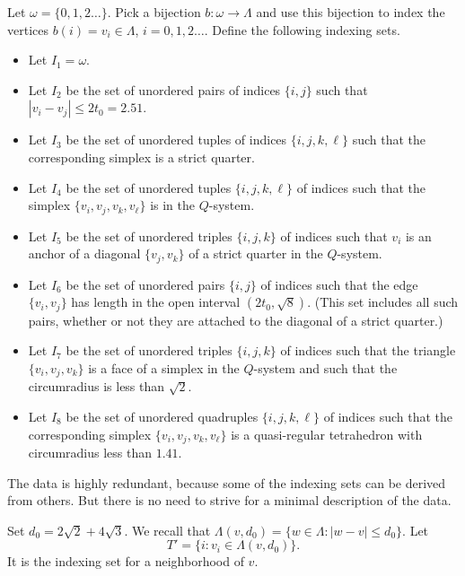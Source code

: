 Let $\omega=\{0,1,2\ldots\}$.  Pick a bijection
$b:\omega\to\Lambda$ and use this bijection to index the vertices
$b(i)=v_i\in\Lambda$, $i=0,1,2\ldots$. Define the following
indexing sets.
   \begin{itemize}
   \item Let $I_1=\omega$.
   \item Let $I_2$ be the set of
      unordered pairs of indices $\{i,j\}$ such that $|v_i-v_j|\le2t_0=2.51$.
   \item Let $I_3$ be the set of unordered tuples of indices
      $\{i,j,k,\ell\}$ such that the corresponding simplex is a strict quarter.
   \item Let $I_4$ be the set of unordered tuples $\{i,j,k,\ell\}$
    of indices
    such that the simplex $\{v_i,v_j,v_k,v_\ell\}$ is in the $Q$-system.
   \item Let $I_5$ be the set of unordered triples $\{i,j,k\}$ of indices
   such that $v_i$ is an anchor of a
    diagonal $\{v_j,v_k\}$ of a strict quarter in the $Q$-system.
   \item Let $I_6$ be the set of unordered pairs $\{i,j\}$ of indices
   such that the
    edge $\{v_i,v_j\}$ has length in the open interval $(2t_0,\sqrt8)$.
    (This
    set includes all such pairs, whether or not they are attached to
    the diagonal of a strict quarter.)
   \item Let $I_7$ be the set of unordered triples $\{i,j,k\}$ of indices
   such that the triangle $\{v_i,v_j,v_k\}$
    is a face of a simplex in the $Q$-system and such that the
    circumradius is less than $\sqrt2$.
   \item Let $I_8$ be the set of unordered quadruples $\{i,j,k,\ell\}$
   of indices
    such that the corresponding simplex $\{v_i,v_j,v_k,v_\ell\}$
    is a quasi-regular tetrahedron
    with circumradius less than $1.41$.
    \end{itemize}

The data is highly redundant, because some of the indexing sets
can be derived from others.  But there is no need to strive for a
minimal description of the data.



\bigskip

Set $d_0=2\sqrt2+4\sqrt3$.   We recall that
$\Lambda(v,d_0)=\{w\in\Lambda: |w-v|\le d_0\}$. Let
    $$T' = \{i : v_i \in \Lambda(v,d_0)\}.$$
It is the indexing set for a neighborhood of $v$.

